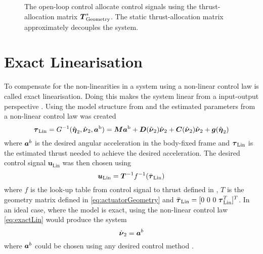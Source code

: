 \begin{figure}
    \centering
    \caption{The open-loop control allocate control signals using the thrust-allocation matrix $\thrusterGeometryOnes[*]$. The static thrust-allocation matrix approximately decouples the system.}
    \label{fig:open_control}
\end{figure}

\section{Exact Linearisation}
To compensate for the non-linearities in a system using a non-linear control law is called exact linearisation. Doing this makes the system linear from a input-output perspective \citep{reglerteori}. Using the model structure from  and the estimated parameters from  a non-linear control law was created 
\begin{equation}\label{eq:exactLin}
\tauVector_{\text{Lin}} = G^{-1}(\hat{\etaVector}_{2},\hat{\nuVector}_{2},\accVector^{\text{b}}) = \inertia \accVector^{\text{b}} + \damping(\hat{\nuVector}_{2})\hat{\nuVector}_{2} + \coriolis(\hat{\nuVector}_{2})\hat{\nuVector}_{2} + \gravity(\hat{\etaVector}_{2})
\end{equation}
where $\accVector^b$ is the desired angular acceleration in the body-fixed frame and $\tauVector_{\text{Lin}}$ is the estimated thrust needed to achieve the desired acceleration.
The desired control signal $\boldsymbol{u}_{\text{Lin}}$ was then chosen using 
\begin{equation}\label{eq:linControlSignal}
\boldsymbol{u}_{\text{Lin}} = \boldsymbol{T}^{-1}f^{-1}(\bar{\tauVector}_{\text{Lin}})
\end{equation} where $f$ is the look-up table from control signal to thrust defined in , $T$ is the geometry matrix defined in \eqref{eq:actuatorGeometry} and $\bar{\tauVector}_{\text{Lin}}=[0~0~0~\tauVector_{\text{Lin}}^T]^T$.
In an ideal case, where the model is exact, using the non-linear control law \eqref{eq:exactLin} would produce the system
\begin{equation}\label{eq:exactLinSys}
\nuVectorAngdot = \accVector^b
\end{equation} 
where $\accVector^b$ could be chosen using any desired control method \citep[p.451]{fossen2011}.

